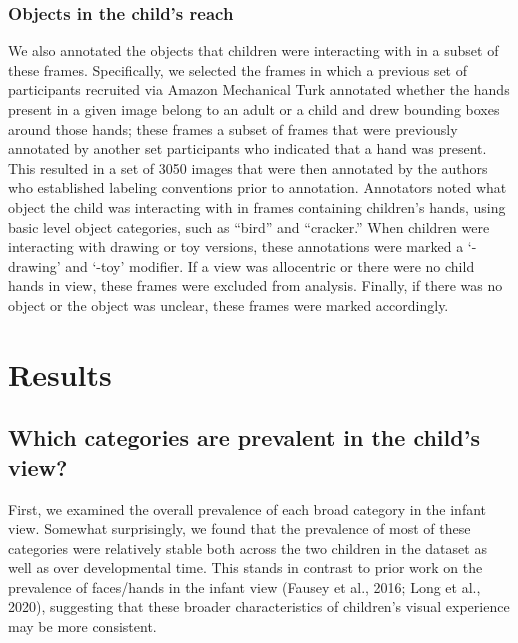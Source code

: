 \documentclass[10pt, letterpaper]{article}
\begin{document}
\hypertarget{objects-in-the-childs-reach}{%
\subsubsection{Objects in the child's
reach}\label{objects-in-the-childs-reach}}

We also annotated the objects that children were interacting with in a
subset of these frames. Specifically, we selected the frames in which a
previous set of participants recruited via Amazon Mechanical Turk
annotated whether the hands present in a given image belong to an adult
or a child and drew bounding boxes around those hands; these frames a
subset of frames that were previously annotated by another set
participants who indicated that a hand was present. This resulted in a
set of 3050 images that were then annotated by the authors who
established labeling conventions prior to annotation. Annotators noted
what object the child was interacting with in frames containing
children's hands, using basic level object categories, such as ``bird''
and ``cracker.'' When children were interacting with drawing or toy
versions, these annotations were marked a `-drawing' and `-toy'
modifier. If a view was allocentric or there were no child hands in
view, these frames were excluded from analysis. Finally, if there was no
object or the object was unclear, these frames were marked accordingly.

\hypertarget{results}{%
\section{Results}\label{results}}

\hypertarget{which-categories-are-prevalent-in-the-childs-view}{%
\subsection{Which categories are prevalent in the child's
view?}\label{which-categories-are-prevalent-in-the-childs-view}}

First, we examined the overall prevalence of each broad category in the
infant view. Somewhat surprisingly, we found that the prevalence of most
of these categories were relatively stable both across the two children
in the dataset as well as over developmental time. This stands in
contrast to prior work on the prevalence of faces/hands in the infant
view (Fausey et al., 2016; Long et al., 2020), suggesting that these
broader characteristics of children's visual experience may be more
consistent.
\end{document}
